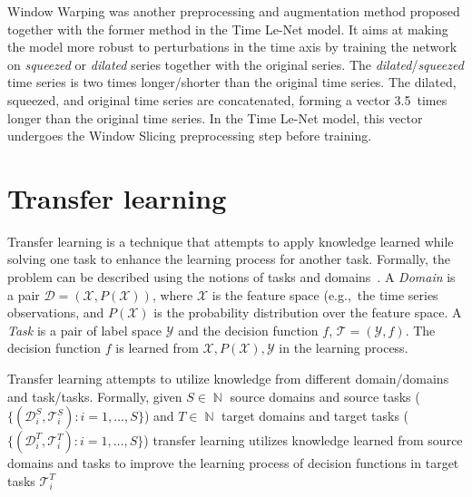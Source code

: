 \documentclass[a4paper,11pt,twoside]{report}
\theoremstyle{definition}
\DeclareMathOperator{\natur}{\mathbb{N}}
\begin{document}
Window Warping was another preprocessing and augmentation method proposed together with the former method in the Time Le-Net model. It aims at making the model more robust to perturbations in the time axis by training the network on \textit{squeezed} or \textit{dilated} series together with the original series. The \textit{dilated}/\textit{squeezed} time series is two times longer/shorter than the original time series.
The dilated, squeezed, and original time series are concatenated, forming a vector 3.5~times longer than the original time series. In the Time Le-Net model, this vector undergoes the Window Slicing preprocessing step before training.



\section{Transfer learning}
Transfer learning is a technique that attempts to apply knowledge learned  while solving one task to enhance the learning process for another task. Formally, the problem can be described using the notions of tasks and domains~\cite{survey_transfer_learning, comp_survey_transfer_leaerning}. A \textit{Domain} is a pair $\mathcal{D}=(\mathcal{X}, P(\mathcal{X}))$, where $\mathcal{X}$ is the feature space (e.g.,~the time series observations, and $P(\mathcal{X})$ is the probability distribution over the feature space. A \textit{Task} is a pair of label space $\mathcal{Y}$ and the decision function $f$, $\mathcal{T} = (\mathcal{Y}, f)$. The decision function $f$ is learned from $\mathcal{X}, P(\mathcal{X}), \mathcal{Y}$ in the learning process.

Transfer learning attempts to utilize knowledge from different domain/domains and task/tasks. Formally, given $S \in \natur$ source domains and source tasks ($\{(\mathcal{D}_i^S,\mathcal{T}_i^S): i=1, \dots, S \}$) and $T \in \natur$ target domains and target tasks ($\{(\mathcal{D}_i^T,\mathcal{T}_i^T): i=1, \dots, S \}$) transfer learning utilizes knowledge learned from source domains and tasks to improve the learning process of decision functions in target tasks $\mathcal{T}_i^T$
\end{document}
